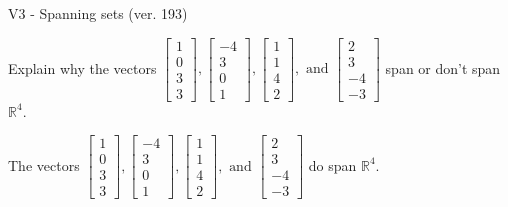 \begin{exercise}
  \begin{exerciseTitle}V3 - Spanning sets (ver. 193)\end{exerciseTitle}
  \begin{exerciseStatement}
    Explain why the vectors \(\left[\begin{array}{r}
1 \\
0 \\
3 \\
3
\end{array}\right] , \left[\begin{array}{r}
-4 \\
3 \\
0 \\
1
\end{array}\right] , \left[\begin{array}{r}
1 \\
1 \\
4 \\
2
\end{array}\right] , \text{ and } \left[\begin{array}{r}
2 \\
3 \\
-4 \\
-3
\end{array}\right]\) span or don't span \(\mathbb{R}^4\). 
	


  \end{exerciseStatement}
  \begin{exerciseAnswer}
   The vectors \(\left[\begin{array}{r}
1 \\
0 \\
3 \\
3
\end{array}\right] , \left[\begin{array}{r}
-4 \\
3 \\
0 \\
1
\end{array}\right] , \left[\begin{array}{r}
1 \\
1 \\
4 \\
2
\end{array}\right] , \text{ and } \left[\begin{array}{r}
2 \\
3 \\
-4 \\
-3
\end{array}\right]\) 
  	 do  
	span \(\mathbb{R}^4\).
  


  \end{exerciseAnswer}
\end{exercise}
